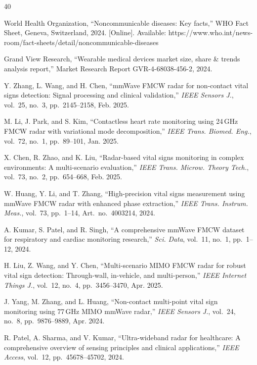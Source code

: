 \documentclass[journal,twoside]{IEEEtran}
\begin{document}
\begin{thebibliography}{40}

World Health Organization, ``Noncommunicable diseases: Key facts,'' WHO Fact Sheet, Geneva, Switzerland, 2024. [Online]. Available: https://www.who.int/news-room/fact-sheets/detail/noncommunicable-diseases

Grand View Research, ``Wearable medical devices market size, share \& trends analysis report,'' Market Research Report GVR-4-68038-456-2, 2024.

Y. Zhang, L. Wang, and H. Chen, ``mmWave FMCW radar for non-contact vital signs detection: Signal processing and clinical validation,'' \textit{IEEE Sensors J.}, vol.~25, no.~3, pp.~2145--2158, Feb. 2025.

M. Li, J. Park, and S. Kim, ``Contactless heart rate monitoring using 24\,GHz FMCW radar with variational mode decomposition,'' \textit{IEEE Trans. Biomed. Eng.}, vol.~72, no.~1, pp.~89--101, Jan. 2025.

X. Chen, R. Zhao, and K. Liu, ``Radar-based vital signs monitoring in complex environments: A multi-scenario evaluation,'' \textit{IEEE Trans. Microw. Theory Tech.}, vol.~73, no.~2, pp.~654--668, Feb. 2025.

W. Huang, Y. Li, and T. Zhang, ``High-precision vital signs measurement using mmWave FMCW radar with enhanced phase extraction,'' \textit{IEEE Trans. Instrum. Meas.}, vol.~73, pp.~1--14, Art.~no.~4003214, 2024.

A. Kumar, S. Patel, and R. Singh, ``A comprehensive mmWave FMCW dataset for respiratory and cardiac monitoring research,'' \textit{Sci. Data}, vol.~11, no.~1, pp.~1--12, 2024.

H. Liu, Z. Wang, and Y. Chen, ``Multi-scenario MIMO FMCW radar for robust vital sign detection: Through-wall, in-vehicle, and multi-person,'' \textit{IEEE Internet Things J.}, vol.~12, no.~4, pp.~3456--3470, Apr. 2025.

J. Yang, M. Zhang, and L. Huang, ``Non-contact multi-point vital sign monitoring using 77\,GHz MIMO mmWave radar,'' \textit{IEEE Sensors J.}, vol.~24, no.~8, pp.~9876--9889, Apr. 2024.

R. Patel, A. Sharma, and V. Kumar, ``Ultra-wideband radar for healthcare: A comprehensive overview of sensing principles and clinical applications,'' \textit{IEEE Access}, vol.~12, pp.~45678--45702, 2024.


\end{thebibliography}
\end{document}
